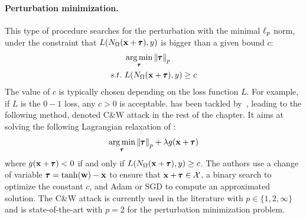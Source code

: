 \paragraph{Perturbation minimization.}
This type of procedure searches for the perturbation with the minimal $\ell_p $ norm, under the constraint that $L(N_\Omega(\mathbf{x} + \pmb{\tau}), y)$ is bigger than a given bound $c$:
\begin{align}
  &\operatorname*{arg\,min}_{\pmb{\tau}} \norm{\pmb{\tau}}_p \label{equation:ch2-normmin} \\
  s.t.\ &L(N_\Omega(\mathbf{x} + \pmb{\tau}), y) \geq c \notag
\end{align}
The value of $c$ is typically chosen depending on the loss function $L$.
For example, if $L$ is the $0-1$ loss, any $c > 0$ is acceptable.
 has been tackled by~\citet{carlini2017towards}, leading to the following method, denoted C\&W attack in the rest of the chapter.
It aims at solving the following Lagrangian relaxation of :
\begin{equation}
  \operatorname*{arg\,min}_{\pmb{\tau}} \norm{\pmb{\tau}}_p + \lambda g(\mathbf{x}+\pmb{\tau})
\end{equation}
where $g(\mathbf{x} + \pmb{\tau})<0$ if and only if $L(N_\Omega(\mathbf{x} + \pmb{\tau}),y) \geq c$. 
The authors use a change of variable $\pmb{\tau} = \tanh(\mathbf{w}) - \mathbf{x}$ to ensure that $\mathbf{x} + \pmb{\tau} \in \mathcal{X}$, a binary search to optimize the constant $c$, and Adam or SGD to compute an approximated solution.
The C\&W attack is currently used in the literature with $p \in \{1, 2, \infty \}$ and is state-of-the-art with $p=2$ for the perturbation minimization problem.





